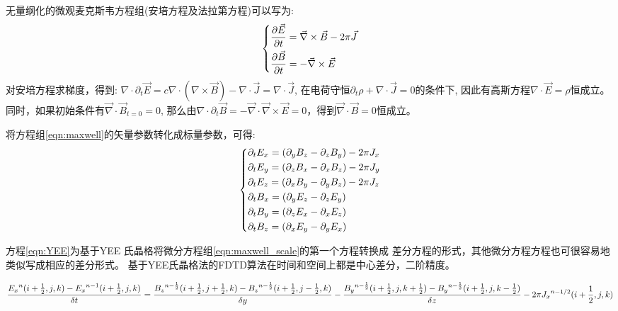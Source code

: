 无量纲化的微观麦克斯韦方程组(安培方程及法拉第方程)可以写为:  
\begin{equation}
\label{eqn:maxwell}
\begin{dcases*}
\frac{\partial{\vec{E}}}{\partial{t}} = \vec{\nabla} \times \vec{B} - 2 \pi \vec{J}  \\
\frac{\partial{\vec{B}}}{\partial{t}} = -\vec{\nabla} \times \vec{E}
\end{dcases*}
\end{equation}  
对安培方程求梯度，得到:  
${\nabla} \cdot {\partial}_t \vec{E} = c {\nabla} \cdot ({\nabla} \times \vec{B})-{\nabla} \cdot \vec{J}={\nabla} \cdot \vec{J} $, 在电荷守恒${\partial}_t  \rho + {\nabla} \cdot \vec{J} =0 $的条件下, 因此有高斯方程${\nabla} \cdot \vec{E}=\rho $恒成立。同时，如果初始条件有$\vec{\nabla} \cdot \vec{B}_{t=0}=0$, 那么由$\nabla \cdot {\partial}_t \vec{B} = -\vec{\nabla} \cdot \vec{\nabla} \times \vec{E} =0$，得到$\vec{\nabla} \cdot \vec{B}=0$恒成立。



将方程组\ref{eqn:maxwell}的矢量参数转化成标量参数，可得:
\begin{equation}
\label{eqn:maxwell_scale}
\begin{dcases*}
\partial_t {E_x}=(\partial_y {B_z} - \partial_z {B_y}) - 2 \pi J_x  \\
\partial_t {E_y}=(\partial_z {B_x} - \partial_x {B_z}) - 2 \pi J_y  \\ 
\partial_t {E_z}=(\partial_x {B_y} - \partial_y {B_z}) - 2 \pi J_z  \\
\partial_t {B_x}=(\partial_y {E_z} - \partial_z {E_y})  \\
\partial_t {B_y}=(\partial_z {E_x} - \partial_x {E_z})  \\
\partial_t {B_z}=(\partial_x {E_y} - \partial_y {E_x})
\end{dcases*}
\end{equation} 
  


方程\ref{eqn:YEE}为基于YEE 氏晶格将微分方程组\ref{eqn:maxwell_scale}的第一个方程转换成
差分方程的形式，其他微分方程方程也可很容易地类似写成相应的差分形式。
基于YEE氏晶格法的FDTD算法在时间和空间上都是中心差分，二阶精度。


\begin{equation}
\label{eqn:YEE}
\frac{{E_x}^{n}(i+\frac{1}{2},j,k)-{E_x}^{n-1}(i+\frac{1}{2},j,k) }{\delta t}=  \\ \frac{{B_z}^{n-\frac{1}{2}}(i+\frac{1}{2},j+\frac{1}{2},k)-{B_z}^{n-\frac{1}{2}}(i+\frac{1}{2},j-\frac{1}{2},k) }{\delta y} -  \\
\frac{{B_y}^{n-\frac{1}{2}}(i+\frac{1}{2},j,k+\frac{1}{2})-{B_y}^{n-\frac{1}{2}}(i+\frac{1}{2},j,k-\frac{1}{2}) }{\delta z}-   \\
2 \pi {J_x}^{n-1/2}(i+\frac{1}{2},j,k)
\end{equation} 





